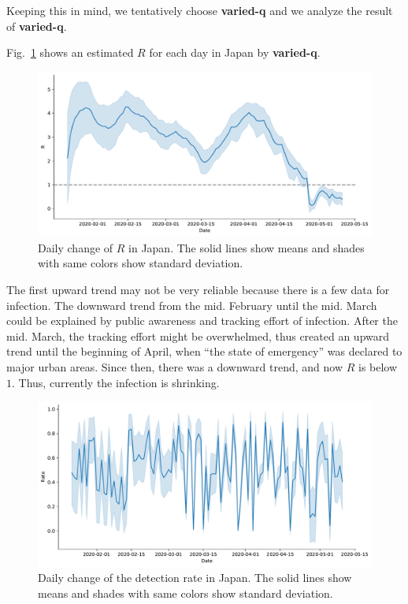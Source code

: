 \documentclass{amsart}
\begin{document}
Keeping this in mind, we tentatively choose \textbf{varied-q} and we analyze the result of \textbf{varied-q}.

Fig.~\ref{fig:b} shows an estimated $R$ for each day in Japan by \textbf{varied-q}.
\begin{figure}[h]
 \centering
 \includegraphics[width=\linewidth]{fig/R_Japan.pdf}
 \caption{Daily change of $R$ in Japan. The solid lines show means and shades with same colors show standard deviation.}
 \label{fig:b}
\end{figure}
The first upward trend may not be very reliable because there is a few data for infection.
The downward trend from the mid. February until the mid. March could be explained by public awareness and tracking effort of infection.
After the mid. March, the tracking effort might be overwhelmed, thus created an upward trend until the beginning of April, when ``the state of emergency'' was declared to major urban areas.
Since then, there was a downward trend, and now $R$ is below $1$.
Thus, currently the infection is shrinking.

\begin{figure}[h]
 \centering
 \includegraphics[width=\linewidth]{fig/q_Japan.pdf}
 \caption{Daily change of the detection rate in Japan. The solid lines show means and shades with same colors show standard deviation.}
 \label{fig:q}
\end{figure}
\end{document}
